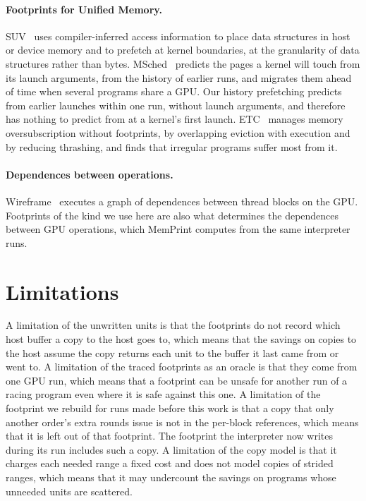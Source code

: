 \documentclass[11pt]{article}
\newcommand{\memprint}{MemPrint}
\begin{document}
\paragraph{Footprints for Unified Memory.} SUV~\cite{B2024SUV} uses compiler-inferred access information to place
data structures in host or device memory and to prefetch at kernel boundaries, at the granularity of data
structures rather than bytes. MSched~\cite{Shen2025MSched} predicts the pages a kernel will touch from its launch
arguments, from the history of earlier runs, and migrates them ahead of time when several programs share a GPU.
Our history prefetching predicts from earlier launches within one run, without launch arguments, and therefore has
nothing to predict from at a kernel's first launch.
ETC~\cite{Li2019ETC} manages memory oversubscription without footprints, by overlapping eviction with execution and
by reducing thrashing, and finds that irregular programs suffer most from it.

\paragraph{Dependences between operations.} Wireframe~\cite{Abdolrashidi2017Wireframe} executes a graph of
dependences between thread blocks on the GPU. Footprints of the kind we use here are also what determines the
dependences between GPU operations, which \memprint{} computes from the same interpreter runs.

\section{Limitations}
\label{sec:limits}

A limitation of the unwritten units is that the footprints do not record which host buffer a copy to the host goes
to, which means that the savings on copies to the host assume the copy returns each unit to the buffer it last came
from or went to. A limitation of the traced footprints as an oracle is that they come from one GPU run, which means
that a footprint can be unsafe for another run of a racing program even where it is safe against this one. A
limitation of the footprint we rebuild for runs made before this work is that a copy that only another order's
extra rounds issue is not in the per-block references, which means that it is left out of that footprint. The
footprint the interpreter now writes during its run includes such a copy. A limitation of the copy model is that it charges
each needed range a fixed cost and does not model copies of strided ranges, which means that it may undercount the
savings on programs whose unneeded units are scattered.
\end{document}
